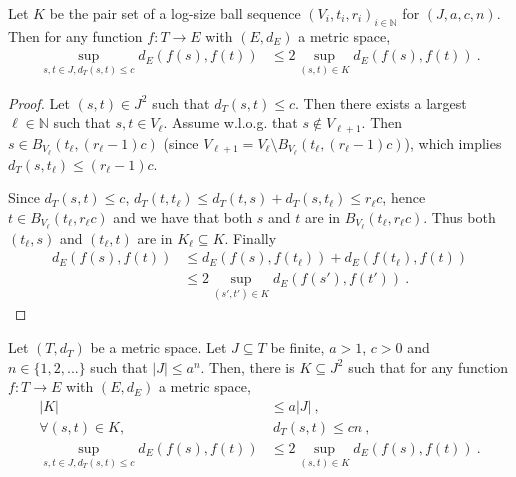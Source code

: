 \begin{lemma}\label{lem:sup_dist_le_two_mul_sup_dist_pairSet}
  \mathlibok
Let $K$ be the pair set of a log-size ball sequence $(V_i, t_i, r_i)_{i \in \mathbb{N}}$ for $(J, a, c, n)$.
Then for any function $f : T \to E$ with $(E,d_E)$ a metric space,
\begin{align*}
  \sup_{s,t\in J, d_T(s,t) \le c} d_E(f(s), f(t))
  & \le 2 \sup_{(s,t) \in K} d_E(f(s), f(t))
  \: .
\end{align*}
\end{lemma}

\begin{proof}
\leanok
Let $(s, t) \in J^2$ such that $d_T(s, t) \le c$.
Then there exists a largest $\ell \in \mathbb{N}$ such that $s, t \in V_\ell$.
Assume w.l.o.g. that $s \notin V_{\ell + 1}$. Then $s \in B_{V_\ell}(t_\ell, (r_\ell-1)c)$ (since $V_{\ell + 1} = V_\ell \setminus B_{V_\ell}(t_\ell, (r_\ell-1)c)$), which implies $d_T(s, t_\ell) \le (r_\ell - 1)c$.

Since $d_T(s, t) \le c$, $d_T(t, t_\ell) \le d_T(t, s) + d_T(s, t_\ell) \le r_\ell c$, hence $t \in B_{V_\ell}(t_\ell, r_\ell c)$ and we have that both $s$ and $t$ are in $B_{V_\ell}(t_\ell, r_\ell c)$.
Thus both $(t_\ell, s)$ and $(t_\ell, t)$ are in $K_\ell \subseteq K$.
Finally
\begin{align*}
  d_E(f(s), f(t))
  &\le d_E(f(s), f(t_\ell)) + d_E(f(t_\ell), f(t))
  \\
  &\le 2\sup_{(s',t') \in K} d_E(f(s'), f(t'))
  \: .
\end{align*}
\end{proof}


\begin{lemma}\label{lem:pair_reduction}
  \mathlibok
Let $(T,d_T)$ be a metric space.
Let $J \subseteq T$ be finite, $a > 1$, $c>0$ and $n \in \{1, 2, ...\}$ such that $|J| \le a^n$.
Then, there is $K \subseteq J^2$ such that for any function $f : T \to E$ with $(E,d_E)$ a metric space,
\begin{align}
  |K|
  & \le a |J|
  \:, \label{eq:chain1} \\
  \forall (s,t) \in K,
  &\:  d_T(s,t) \le c n
  \:, \label{eq:chain2} \\
  \sup_{s,t\in J, d_T(s,t) \le c} d_E(f(s), f(t))
  & \le 2 \sup_{(s,t) \in K} d_E(f(s), f(t))
  \: . \label{eq:chain3}
\end{align}
\end{lemma}

